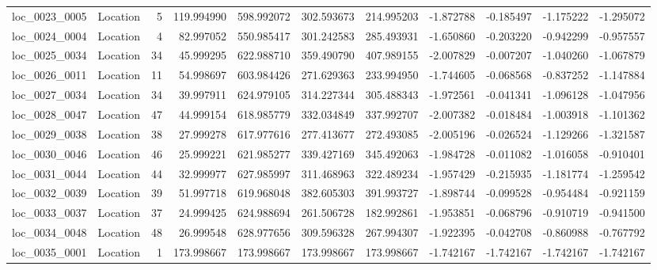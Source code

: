 \begin{tabular}{llrrrrrrrrr}
loc_0023_0005 &        Location &               5 & 119.994990 & 598.992072 &  302.593673 &    214.995203 &  -1.872788 &  -0.185497 &   -1.175222 &     -1.295072 \\
loc_0024_0004 &        Location &               4 &  82.997052 & 550.985417 &  301.242583 &    285.493931 &  -1.650860 &  -0.203220 &   -0.942299 &     -0.957557 \\
loc_0025_0034 &        Location &              34 &  45.999295 & 622.988710 &  359.490790 &    407.989155 &  -2.007829 &  -0.007207 &   -1.040260 &     -1.067879 \\
loc_0026_0011 &        Location &              11 &  54.998697 & 603.984426 &  271.629363 &    233.994950 &  -1.744605 &  -0.068568 &   -0.837252 &     -1.147884 \\
loc_0027_0034 &        Location &              34 &  39.997911 & 624.979105 &  314.227344 &    305.488343 &  -1.972561 &  -0.041341 &   -1.096128 &     -1.047956 \\
loc_0028_0047 &        Location &              47 &  44.999154 & 618.985779 &  332.034849 &    337.992707 &  -2.007382 &  -0.018484 &   -1.003918 &     -1.101362 \\
loc_0029_0038 &        Location &              38 &  27.999278 & 617.977616 &  277.413677 &    272.493085 &  -2.005196 &  -0.026524 &   -1.129266 &     -1.321587 \\
loc_0030_0046 &        Location &              46 &  25.999221 & 621.985277 &  339.427169 &    345.492063 &  -1.984728 &  -0.011082 &   -1.016058 &     -0.910401 \\
loc_0031_0044 &        Location &              44 &  32.999977 & 627.985997 &  311.468963 &    322.489234 &  -1.957429 &  -0.215935 &   -1.181774 &     -1.259542 \\
loc_0032_0039 &        Location &              39 &  51.997718 & 619.968048 &  382.605303 &    391.993727 &  -1.898744 &  -0.099528 &   -0.954484 &     -0.921159 \\
loc_0033_0037 &        Location &              37 &  24.999425 & 624.988694 &  261.506728 &    182.992861 &  -1.953851 &  -0.068796 &   -0.910719 &     -0.941500 \\
loc_0034_0048 &        Location &              48 &  26.999548 & 628.977656 &  309.596328 &    267.994307 &  -1.922395 &  -0.042708 &   -0.860988 &     -0.767792 \\
loc_0035_0001 &        Location &               1 & 173.998667 & 173.998667 &  173.998667 &    173.998667 &  -1.742167 &  -1.742167 &   -1.742167 &     -1.742167 \\

\end{tabular}
